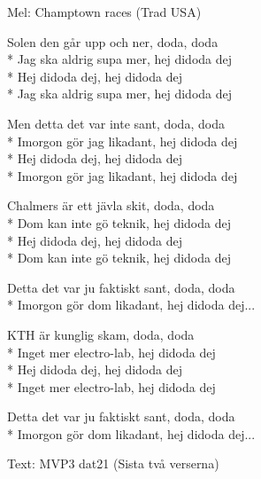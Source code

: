 \begin{SongText}[Solen]
    \begin{SongInfo}
        Mel: Champtown races (Trad USA)
    \end{SongInfo}
    \begin{SongVerse}
        Solen den går upp och ner, doda, doda\\*%
        Jag ska aldrig supa mer, hej didoda dej\\*%
        Hej didoda dej, hej didoda dej\\*%
        Jag ska aldrig supa mer, hej didoda dej
    \end{SongVerse}
    \begin{SongVerse}
        Men detta det var inte sant, doda, doda\\*%
        Imorgon gör jag likadant, hej didoda dej\\*%
        Hej didoda dej, hej didoda dej\\*%
        Imorgon gör jag likadant, hej didoda dej
    \end{SongVerse}
    \begin{SongVerse}
        Chalmers är ett jävla skit, doda, doda\\*%
        Dom kan inte gö teknik, hej didoda dej\\*%
        Hej didoda dej, hej didoda dej\\*%
        Dom kan inte gö teknik, hej didoda dej
    \end{SongVerse}
    \begin{SongVerse}
        Detta det var ju faktiskt sant, doda, doda\\*%
        Imorgon gör dom likadant, hej didoda dej...
    \end{SongVerse}
    \begin{SongVerse}
        KTH är kunglig skam, doda, doda\\*%
        Inget mer electro-lab, hej didoda dej\\*%
        Hej didoda dej, hej didoda dej\\*%
        Inget mer electro-lab, hej didoda dej
    \end{SongVerse}
    \begin{SongVerse}
        Detta det var ju faktiskt sant, doda, doda\\*%
        Imorgon gör dom likadant, hej didoda dej...
    \end{SongVerse}
    \begin{SongInfo}
        Text: MVP3 dat21 (Sista två verserna)
    \end{SongInfo}
\end{SongText}
